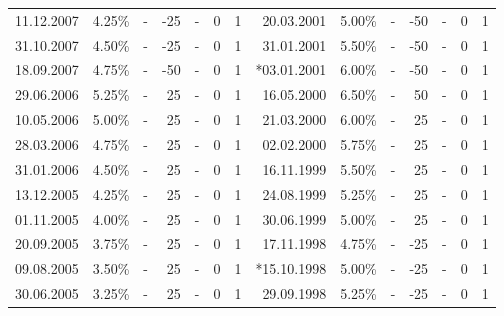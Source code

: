 \documentclass[11pt,a4paper,english,oneside]{book}
\numberwithin{equation}{chapter}
\begin{document}
\begin{table}
\begin{tabular}{r r r r r c c | r r r r r c c }
		\cellcolor{lightgray!25}11.12.2007 & \cellcolor{lightgray!25}4.25\% &  \cellcolor{lightgray!25} -    & \cellcolor{lightgray!25}-25 &  \cellcolor{lightgray!25}-   & 0 & 1 & \cellcolor{lightgray!25}20.03.2001 & \cellcolor{lightgray!25}5.00\% &  \cellcolor{lightgray!25}- & \cellcolor{lightgray!25}-50 &  \cellcolor{lightgray!25}- & 0 & 1 \\
		\cellcolor{lightgray!25}31.10.2007 & \cellcolor{lightgray!25}4.50\% &  \cellcolor{lightgray!25} -    & \cellcolor{lightgray!25}-25 &  \cellcolor{lightgray!25}-   & 0 & 1 & \cellcolor{lightgray!25}31.01.2001 & \cellcolor{lightgray!25}5.50\% &  \cellcolor{lightgray!25}- & \cellcolor{lightgray!25}-50 &  \cellcolor{lightgray!25}- & 0 & 1 \\
		\cellcolor{lightgray!25}18.09.2007 & \cellcolor{lightgray!25}4.75\% &  \cellcolor{lightgray!25} -    & \cellcolor{lightgray!25}-50 &  \cellcolor{lightgray!25}-   & 0 & 1 & \cellcolor{lightgray!25}*03.01.2001 & \cellcolor{lightgray!25}6.00\% &  \cellcolor{lightgray!25}- & \cellcolor{lightgray!25}-50 &  \cellcolor{lightgray!25}- & 0 & 1 \\
		29.06.2006 & 5.25\% &   -    & 25  &  -   & 0 & 1 & 16.05.2000 & 6.50\% &  - & 50  &  - & 0 & 1 \\
		10.05.2006 & 5.00\% &   -    & 25  &  -   & 0 & 1 & 21.03.2000 & 6.00\% &  - & 25  &  - & 0 & 1 \\
		28.03.2006 & 4.75\% &   -    & 25  &  -   & 0 & 1 & 02.02.2000 & 5.75\% &  - & 25  &  - & 0 & 1 \\
		31.01.2006 & 4.50\% &   -    & 25  &  -   & 0 & 1 & 16.11.1999 & 5.50\% &  - & 25  &  - & 0 & 1 \\
		13.12.2005 & 4.25\% &   -    & 25  &  -   & 0 & 1 & 24.08.1999 & 5.25\% &  - & 25  &  - & 0 & 1 \\
		01.11.2005 & 4.00\% &   -    & 25  &  -   & 0 & 1 & 30.06.1999 & 5.00\% &  - & 25  &  - & 0 & 1 \\
		20.09.2005 & 3.75\% &   -    & 25  &  -   & 0 & 1 & \cellcolor{lightgray!25}17.11.1998 & \cellcolor{lightgray!25}4.75\% &  \cellcolor{lightgray!25}- & \cellcolor{lightgray!25}-25 &  \cellcolor{lightgray!25}- & 0 & 1 \\
		09.08.2005 & 3.50\% &   -    & 25  &  -   & 0 & 1 & \cellcolor{lightgray!25}*15.10.1998 & \cellcolor{lightgray!25}5.00\% &  \cellcolor{lightgray!25}- & \cellcolor{lightgray!25}-25 &  \cellcolor{lightgray!25}- & 0 & 1 \\
		30.06.2005 & 3.25\% &   -    & 25  &  -   & 0 & 1 & \cellcolor{lightgray!25}29.09.1998 & \cellcolor{lightgray!25}5.25\% &  \cellcolor{lightgray!25}- & \cellcolor{lightgray!25}-25 &  \cellcolor{lightgray!25}- & 0 & 1 \\

\end{tabular}
\end{table}
\end{document}
